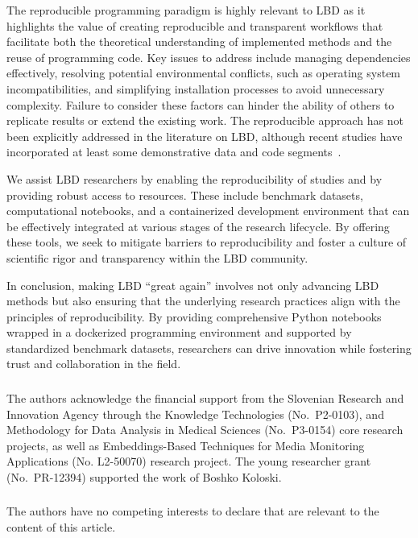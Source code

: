\documentclass[runningheads]{llncs}
\begin{document}
The reproducible programming paradigm is highly relevant to LBD as it highlights the value of creating reproducible and transparent workflows that facilitate both the theoretical understanding of implemented methods and the reuse of programming code. Key issues to address include managing dependencies effectively, resolving potential environmental conflicts, such as operating system incompatibilities, and simplifying installation processes to avoid unnecessary complexity. Failure to consider these factors can hinder the ability of others to replicate results or extend the existing work. The reproducible approach has not been explicitly addressed in the literature on LBD, although recent studies have incorporated at least some demonstrative data and code segments~\cite{sebastian2017emerging,thilakaratne2019systematic}.

We assist LBD researchers by enabling the reproducibility of studies and by providing robust access to resources. These include benchmark datasets, computational notebooks, and a containerized development environment that can be effectively integrated at various stages of the research lifecycle. By offering these tools, we seek to mitigate barriers to reproducibility and foster a culture of scientific rigor and transparency within the LBD community.

In conclusion, making LBD ``great again'' involves not only advancing LBD methods but also ensuring that the underlying research practices align with the principles of reproducibility. By providing comprehensive Python notebooks wrapped in a dockerized programming environment and supported by standardized benchmark datasets, researchers can drive innovation while fostering trust and collaboration in the field.

\begin{credits}
\subsubsection{\ackname} The authors acknowledge the financial support from the Slovenian Research and Innovation Agency through the Knowledge Technologies (No.\ P2-0103), and Methodology for Data Analysis in Medical Sciences (No.\ P3-0154) core research projects, as well as Embeddings-Based Techniques for Media Monitoring Applications (No. L2-50070) research project. The young researcher grant (No.\ PR-12394) supported the work of Boshko Koloski.

\subsubsection{\discintname}
The authors have no competing interests to declare that are relevant to the content of this article.
\end{credits}



\end{document}
